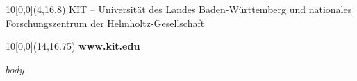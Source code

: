 \documentclass{thesisclass}
\begin{document}
\begin{titlepage}
	\vspace{2cm}


	\begin{textblock}{10}[0,0](4,16.8)
	\tiny{ 
			{KIT -- Universität des Landes Baden-Württemberg und nationales Forschungszentrum der Helmholtz-Gesellschaft}
	}
	\end{textblock}

	\begin{textblock}{10}[0,0](14,16.75)
	\large{
		\textbf{www.kit.edu} 
	}
	\end{textblock}

	\end{titlepage}
\blankpage

\tableofcontents
\blankpage

\mainmatter
{}

$body$

\Erklaerung
\end{document}
